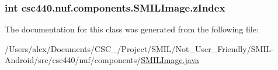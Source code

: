 \hypertarget{classcsc440_1_1nuf_1_1components_1_1_s_m_i_l_image_a9aeac60e77b5bd6e8fe368bd49016def}{
\subsubsection[{z\-Index}]{\setlength{\rightskip}{0pt plus 5cm}int {\bf csc440.\-nuf.\-components.\-S\-M\-I\-L\-Image.\-z\-Index}}}\label{classcsc440_1_1nuf_1_1components_1_1_s_m_i_l_image_a9aeac60e77b5bd6e8fe368bd49016def}


The documentation for this class was generated from the following file\-:\begin{DoxyCompactItemize}
\item 
/\-Users/alex/\-Documents/\-C\-S\-C\-\_/\-Project/\-S\-M\-I\-L/\-Not\-\_\-\-User\-\_\-\-Friendly/\-S\-M\-I\-L-\/\-Android/src/csc440/nuf/components/\hyperlink{_s_m_i_l_image_8java}{S\-M\-I\-L\-Image.\-java}\end{DoxyCompactItemize}
